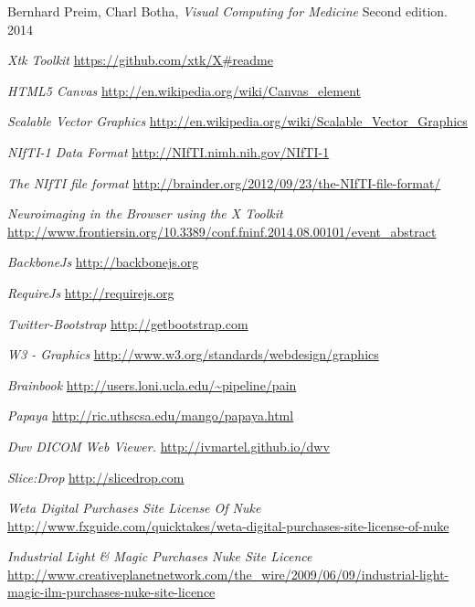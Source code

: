 \documentclass[a4paper,11pt,twoside]{article}
\begin{document}
\begin{thebibliography}{1}



  Bernhard Preim, Charl Botha, {\em Visual Computing for Medicine} Second edition. 2014
  
    {\em Xtk Toolkit } \url{https://github.com/xtk/X#readme}
   
       {\em HTML5 Canvas} \url{http://en.wikipedia.org/wiki/Canvas_element}
   
       {\em    Scalable Vector Graphics} \url{http://en.wikipedia.org/wiki/Scalable_Vector_Graphics}

   
   
      {\em NIfTI-1 Data Format} \url{http://NIfTI.nimh.nih.gov/NIfTI-1}
     
	 {\em The NIfTI file format} \url{http://brainder.org/2012/09/23/the-NIfTI-file-format/} 
   
       {\em Neuroimaging in the Browser using the X Toolkit } \url{http://www.frontiersin.org/10.3389/conf.fninf.2014.08.00101/event_abstract} 

   {\em BackboneJs } \url{http://backbonejs.org} 
  
   {\em RequireJs } \url{http://requirejs.org} 
  
   {\em Twitter-Bootstrap } \url{http://getbootstrap.com} 	
  
   {\em W3 - Graphics } \url{http://www.w3.org/standards/webdesign/graphics}
  
   {\em Brainbook } \url{http://users.loni.ucla.edu/~pipeline/pain} 
  
   {\em Papaya } \url{http://ric.uthscsa.edu/mango/papaya.html} 
  
     {\em Dwv DICOM Web Viewer. } \url{http://ivmartel.github.io/dwv} 

     {\em Slice:Drop} \url{http://slicedrop.com} 
    
  
    
   {\em Weta Digital Purchases Site License Of Nuke } \url{http://www.fxguide.com/quicktakes/weta-digital-purchases-site-license-of-nuke} 
        
   {\em Industrial Light \& Magic Purchases Nuke Site Licence } \url{http://www.creativeplanetnetwork.com/the_wire/2009/06/09/industrial-light-magic-ilm-purchases-nuke-site-licence} 


\end{thebibliography}
\end{document}
